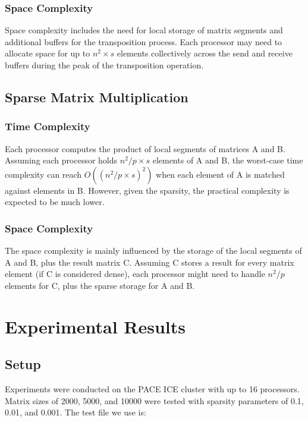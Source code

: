 \documentclass{article}
\begin{document}
\subsubsection{Space Complexity}
Space complexity includes the need for local storage of matrix segments and additional buffers for the transposition process. Each processor may need to allocate space for up to \( n^2 \times s \) elements collectively across the send and receive buffers during the peak of the transposition operation.

\subsection{Sparse Matrix Multiplication}

\subsubsection{Time Complexity}
Each processor computes the product of local segments of matrices A and B. Assuming each processor holds \( n^2 / p \times s \) elements of A and B, the worst-case time complexity can reach \( O((n^2 / p \times s)^2) \) when each element of A is matched against elements in B. However, given the sparsity, the practical complexity is expected to be much lower.

\subsubsection{Space Complexity}
The space complexity is mainly influenced by the storage of the local segments of A and B, plus the result matrix C. Assuming C stores a result for every matrix element (if C is considered dense), each processor might need to handle \( n^2 / p \) elements for C, plus the sparse storage for A and B.

\section{Experimental Results}
\subsection{Setup}
Experiments were conducted on the PACE ICE cluster with up to 16 processors. Matrix sizes of 2000, 5000, and 10000 were tested with sparsity parameters of 0.1, 0.01, and 0.001. The test file we use is:
\end{document}
